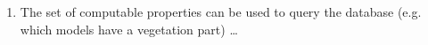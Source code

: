 \documentclass[96pt]{article}
\begin{document}
\begin{tcbposter}
{\begin{multicols*}{4}
\begin{enumerate}
    An obvious consequence is that the information about a model can be provided in different ways.
    There is no need to force the user into a rigid record format.
    Another consequence is that records do not have to be complete. The framework accepts all information
    about a model and (computes what it can do with it).
    \item
    The set of computable properties can be used to query the database (e.g. which models have a vegetation part)
    \dots
    \end{enumerate}
%

\end{multicols*}}
\end{tcbposter}
\end{document}
